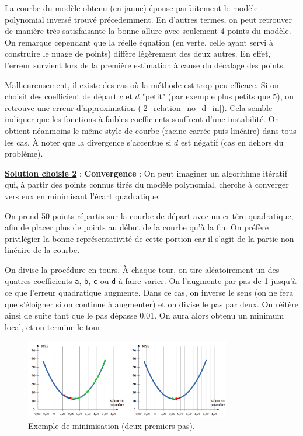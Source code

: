\documentclass[12pt]{article}
\begin{document}
    La courbe du modèle obtenu (en jaune) épouse parfaitement le modèle polynomial inversé trouvé précedemment. En d'autres termes, on peut retrouver de manière très satisfaisante la bonne allure avec seulement 4 points du modèle. On remarque cependant que la réelle équation (en verte, celle ayant servi à construire le nuage de points) diffère légèrement des deux autres. En effet, l'erreur survient lors de la première estimation à cause du décalage des points.

    \label{2_relation_no_d_out} Malheureusement, il existe des cas où la méthode est trop peu efficace. Si on choisit des coefficient de départ $c$ et $d$ "petit" (par exemple plus petits que 5), on retrouve une erreur d'approximation (\ref{2_relation_no_d_in}). Cela semble indiquer que les fonctions à faibles coefficients souffrent d'une instabilité. On obtient néanmoins le même style de courbe (racine carrée puis linéaire) dans tous les cas. À noter que la divergence s'accentue si $d$ est négatif (cas en dehors du problème).
    
    \bigskip
    
    \textbf{\underline{Solution choisie 2}} : \label{conconvergence} \textbf{Convergence} : On peut imaginer un algorithme itératif qui, à partir des points connus tirés du modèle polynomial, cherche à converger vers eux en minimisant l'écart quadratique.

    On prend 50 points répartis sur la courbe de départ avec un critère quadratique, afin de placer plus de points au début de la courbe qu'à la fin. On préfère privilégier la bonne représentativité de cette portion car il s'agit de la partie non linéaire de la courbe.
    
    On divise la procédure en tours. À chaque tour, on tire aléatoirement un des quatres coefficients \texttt{a}, \texttt{b}, \texttt{c} ou \texttt{d} à faire varier. On l'augmente par pas de 1 jusqu'à ce que l'erreur quadratique augmente. Dans ce cas, on inverse le sens (on ne fera que s'éloigner si on continue à augmenter) et on divise le pas par deux. On réitère ainsi de suite tant que le pas dépasse 0.01. On aura alors obtenu un minimum local, et on termine le tour.

    \begin{figure}[ht!]
        \centering
        \includegraphics[width=0.8\textwidth]{Images/RelationInv_Step.png}  
        \caption{Exemple de minimisation (deux premiers pas).}
    \end{figure}
\end{document}
